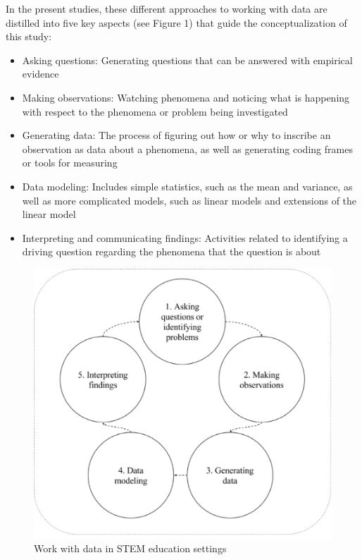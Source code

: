\documentclass[]{msu-thesis}
\providecommand{\tightlist}{%
  \setlength{\itemsep}{0pt}\setlength{\parskip}{0pt}}
\theoremstyle{definition}
\theoremstyle{definition}
\theoremstyle{definition}
\theoremstyle{remark}
\begin{document}
In the present studies, these different approaches to working with data
are distilled into five key aspects (see Figure 1) that guide the
conceptualization of this study:

\begin{itemize}
\tightlist
\item
  Asking questions: Generating questions that can be answered with
  empirical evidence
\item
  Making observations: Watching phenomena and noticing what is happening
  with respect to the phenomena or problem being investigated
\item
  Generating data: The process of figuring out how or why to inscribe an
  observation as data about a phenomena, as well as generating coding
  frames or tools for measuring
\item
  Data modeling: Includes simple statistics, such as the mean and
  variance, as well as more complicated models, such as linear models
  and extensions of the linear model
\item
  Interpreting and communicating findings: Activities related to
  identifying a driving question regarding the phenomena that the
  question is about
\end{itemize}

\begin{figure}

{\centering \includegraphics[width=0.8\linewidth]{images/figure1} 

}

\caption{Work with data in STEM education settings}\label{fig:unnamed-chunk-1}
\end{figure}
\end{document}
